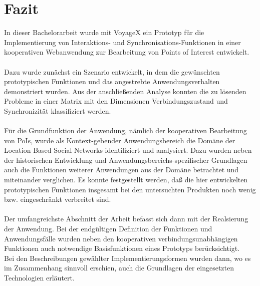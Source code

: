 \newpage
%
%
\section{Fazit}
In dieser Bachelorarbeit wurde mit VoyageX ein Prototyp für die Implementierung von Interaktions- und Synchronisations-Funktionen in einer kooperativen Webanwendung zur Bearbeitung von Points of Interest entwickelt.\\ \\
Dazu wurde zunächst ein Szenario entwickelt, in dem die gewünschten prototypischen Funktionen und das angestrebte Anwendungsverhalten demonstriert wurden. Aus der anschließenden Analyse konnten die zu lösenden Probleme in einer Matrix mit den Dimensionen Verbindungszustand und Synchronizität klassifiziert werden.\\ \\
Für die Grundfunktion der Anwendung, nämlich der kooperativen Bearbeitung von PoIs, wurde als Kontext-gebender Anwendungsbereich die Domäne der Location Based Social Networks identifiziert und analysiert. Dazu wurden neben der historischen Entwicklung und Anwendungsbereichs-spezifischer Grundlagen auch die Funktionen weiterer Anwendungen aus der Domäne betrachtet und miteinander verglichen.
Es konnte festgestellt werden, daß die hier entwickelten prototypischen Funktionen insgesamt bei den untersuchten Produkten noch wenig bzw. eingeschränkt verbreitet sind.\\ \\
Der umfangreichste Abschnitt der Arbeit befasst sich dann mit der Realsierung der Anwendung. Bei der endgültigen Definition der Funktionen und Anwendungsfälle wurden neben den kooperativen verbindungsunabhängigen Funktionen auch notwendige Basisfunktionen eines Prototyps berücksichtigt.\\
Bei den Beschreibungen gewählter Implementierungsformen wurden dann, wo es im Zusammenhang sinnvoll erschien, auch die Grundlagen der eingesetzten Technologien erläutert. 
